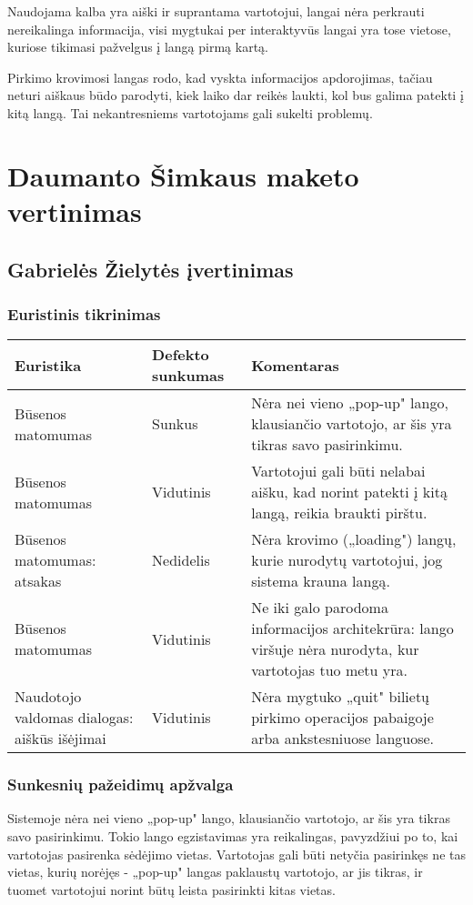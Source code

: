 \documentclass{VUMIFPSkursinis}
\begin{document}
Naudojama kalba yra aiški ir suprantama vartotojui, langai nėra perkrauti nereikalinga informacija, visi mygtukai per interaktyvūs langai yra tose vietose, kuriose tikimasi pažvelgus į langą pirmą kartą.

Pirkimo krovimosi langas rodo, kad vyskta informacijos apdorojimas, tačiau neturi aiškaus būdo parodyti, kiek laiko dar reikės laukti, kol bus galima patekti į kitą langą. Tai nekantresniems vartotojams gali sukelti problemų.

\section{Daumanto Šimkaus maketo vertinimas}
\subsection{Gabrielės Žielytės įvertinimas}
\subsubsection{Euristinis tikrinimas}
\begin{center}
 \begin{tabular}{|| p{4cm} | p{4cm} | p{8cm} ||} 
 \hline
 Euristika & Defekto sunkumas & Komentaras \\
 \hline\hline
 Būsenos matomumas & Sunkus & Nėra nei vieno „pop-up" lango, klausiančio vartotojo, ar šis yra tikras savo pasirinkimu.\\ 
 \hline
 Būsenos matomumas & Vidutinis & Vartotojui gali būti nelabai aišku, kad norint patekti į kitą langą, reikia braukti pirštu.\\
 \hline
 Būsenos matomumas: atsakas & Nedidelis & Nėra krovimo („loading") langų, kurie nurodytų vartotojui, jog sistema krauna langą. \\
 \hline
 Būsenos matomumas & Vidutinis & Ne iki galo parodoma informacijos architekrūra: lango viršuje nėra nurodyta, kur vartotojas tuo metu yra. \\  
 \hline   
 Naudotojo valdomas dialogas: aiškūs išėjimai & Vidutinis & Nėra mygtuko „quit" bilietų pirkimo operacijos pabaigoje arba ankstesniuose languose. \\
 \hline              
\end{tabular}	
\end{center}

\subsubsection{Sunkesnių pažeidimų apžvalga}
Sistemoje nėra nei vieno „pop-up" lango, klausiančio vartotojo, ar šis yra tikras savo pasirinkimu. Tokio lango egzistavimas yra reikalingas, pavyzdžiui po to, kai vartotojas pasirenka sėdėjimo vietas. Vartotojas gali būti netyčia pasirinkęs ne tas vietas, kurių norėjęs - „pop-up" langas paklaustų vartotojo, ar jis tikras, ir tuomet vartotojui norint būtų leista pasirinkti kitas vietas.
\end{document}
